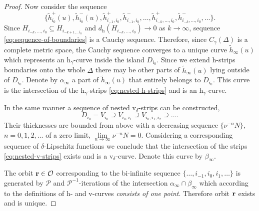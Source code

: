 \begin{proof}
	Now consider the sequence
	\begin{equation}
		\{ \widetilde{h}_{i_0}^+(u), \widetilde{h}_{i_0}^-(u), \widetilde{h}_{i_{-1}, i_0}^+, \widetilde{h}_{i_{-1}, i_0}^-, \dots, \widetilde{h}_{i_{-k}, \dots, i_0}^+, \widetilde{h}_{i_{-k}, \dots, i_0}^-, \dots \}.
	\label{eq:sequence-of-boundaries}
	\end{equation}
	Since $H_{i_{-k}, \dots, i_0} \subseteq H_{i_{-k+1, \dots i_0}}$ and $d_{\mathrm{h}}(H_{i_{-k}, \dots, i_0}) \to 0$ as $k \to \infty$, sequence \eqref{eq:sequence-of-boundaries} is a Cauchy sequence.
	Therefore, since $C_{\gamma}(\Delta)$ is a complete metric space, the Cauchy sequence converges to a unique curve $\widetilde{h}_{\infty}(u)$ which represents an $\mathrm{h}_{\gamma}$-curve inside the island $D_{i_0}$.
	Since we extend h-strips boundaries onto the whole $\Delta$ there may be other parts of $\widetilde{h}_{\infty}(u)$ lying outside of $D_{i_0}$.
	Denote by $\alpha_{\infty}$ a part of $\widetilde{h}_{\infty}(u)$ that entirely belongs to $D_{i_0}$.
	This curve is the intersection of the $\mathrm{h}_{\gamma}$-strips \eqref{eq:nested-h-strips} and is an $\mathrm{h}_{\gamma}$-curve.
	
	In the same manner a sequence of nested $\mathrm{v}_{\delta}$-strips can be constructed,
	\begin{equation}
		D_{i_0} = V_{i_0} \supseteq V_{i_0, i_1} \supseteq V_{i_0, i_1, i_2} \supseteq \dots.
	\label{eq:nested-v-strips}
	\end{equation}
	Their thicknesses are bounded from above with a decreasing sequence $\{ \nu^{-n} N \}$, $n = 0, 1, 2, \dots$ of a zero limit, $\lim \limits_{n \to \infty} \nu^{-n} N = 0$.
	Considering a corresponding sequence of $\delta$-Lipschitz functions we conclude that the intersection of the strips \eqref{eq:nested-v-strips} exists and is a $\mathrm{v}_\delta$-curve.
	Denote this curve by $\beta_{\infty}$.
	
	The orbit $\vb{r} \in \mathcal{O}$ corresponding to the bi-infinite sequence $\{ \dots, i_{-1}, i_0, i_1, \dots \}$ is generated by $\mathcal{P}$ and $\mathcal{P}^{-1}$-iterations of the intersection $\alpha_{\infty} \cap \beta_{\infty}$ which according to the definitions of h- and v-curves {\it consists of one point}.
	Therefore orbit $\vb{r}$ exists and is unique.
	

\end{proof}
